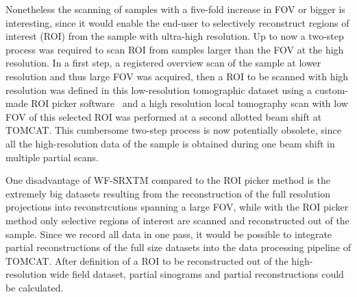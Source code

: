 Nonetheless the scanning of samples with a five-fold increase in FOV or bigger is interesting, since it would enable the end-user to selectively reconstruct regions of interest (ROI) from the sample with ultra-high resolution. Up to now a two-step process was required to scan ROI from samples larger than the FOV at the high resolution. In a first step, a registered overview scan of the sample at lower resolution and thus large FOV was acquired, then a ROI to be scanned with high resolution was defined in this low-resolution tomographic dataset using a custom-made ROI picker software~\cite{Heinzer2008} and a high resolution local tomography scan with low FOV of this selected ROI was performed at a second allotted beam shift at TOMCAT. This cumbersome two-step process is now potentially obsolete, since all the high-resolution data of the sample is obtained during one beam shift in multiple partial scans.

One disadvantage of WF-SRXTM compared to the ROI picker method is the extremely big datasets resulting from the reconstruction of the full resolution projections into reconstrcutions spanning a large FOV, while with the ROI picker method only selective regions of interest are scanned and reconstructed out of the sample. Since we record all data in one pass, it would be possible to integrate partial reconstructions of the full size datasets into the data processing pipeline of TOMCAT. After definition of a ROI to be reconstructed out of the high-resolution wide field dataset, partial sinograms and partial reconstructions could be calculated.
\cbend